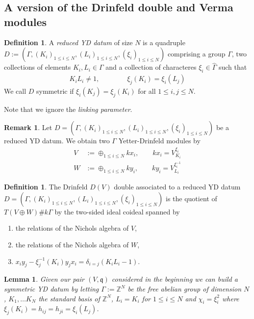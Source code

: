 \documentclass{amsart}
\newtheorem{lemma}[theorem]{Lemma}
\theoremstyle{definition}
\newtheorem{definition}[theorem]{Definition}
\newtheorem*{remark}{Remark}
\begin{document}
\subsection{A version of the Drinfeld double and Verma modules}

\begin{definition}{{\cite[Definition 3.1]{Andruskiewitsch2010}}}
	A \emph{reduced YD datum} of size $N$ is a quadruple $ D:= (\Gamma, (K_i)_{1\leq i \leq N}, (L_i)_{1\leq i \leq N}, (\xi_i)_{1\leq i \leq N} )$ comprising a group $\Gamma$, two collections of elements $K_i, L_i\in \Gamma$ and a collection of characteres $\xi_i \in \widehat \Gamma$ such that
	\begin{align}
	K_i L_i \neq 1, \qquad \qquad
	\xi_j(K_i) = \xi_i(L_j)
	\end{align}
	We call $D$ symmetric if $\xi_i(K_j)= \xi_j(K_i)$ for all $1\leq i,j \leq N$.
\end{definition}

Note that we ignore the \emph{linking parameter}.

\begin{remark}
	Let $D = (\Gamma, (K_i)_{1\leq i \leq N}, (L_i)_{1\leq i \leq N}, (\xi_i)_{1\leq i \leq N})$ be a reduced YD datum.
	We obtain two $\Gamma$ Yetter-Drinfeld modules by
	\begin{align}
	V &:= \oplus_{1\leq i \leq N} kx_i, \qquad kx_i = V_{K_i}^{\xi_i} \\
	W &:= \oplus_{1\leq i \leq N} ky_i, \qquad ky_i = V_{L_i}^{\xi_i^{-1}} 
	\end{align} 
\end{remark}

\begin{definition}{{\cite[Definition 3.3]{Andruskiewitsch2010}}}
	The Drinfeld $D(V)$ double associated to a reduced YD datum $D = (\Gamma, (K_i)_{1\leq i \leq N}, (L_i)_{1\leq i \leq N}, (\xi_i)_{1\leq i \leq N})$ is the quotient of 
	$T(V \oplus W) \# k \Gamma$ by the two-sided ideal coideal spanned by
	\begin{enumerate}
		\item the relations of the Nichols algebra of $V$,
		\item the relations of the Nichols algebra of $W$,
		\item $x_i y_j - \xi_j^{-1}(K_i) y_j x_i = \delta_{i=j} (K_iL_i -1)$.
	\end{enumerate}
\end{definition}


\begin{lemma}
	Given our pair $(V,\mathfrak q)$ considered in the beginning we can build a symmetric YD datum by letting 
	$\Gamma := \mathbb Z^N$ be the free abelian group of dimension $N$,
	$K_1,\dotsc K_N$ the standard basis of $\mathbb Z^N$, $L_i =K_i$ for $1 \leq i \leq N$ and $\chi_i= \xi_i^2$ where
	$\xi_j(K_i) = h_{ij}= h_{ji} = \xi_i(L_j)$.
\end{lemma}
\end{document}
